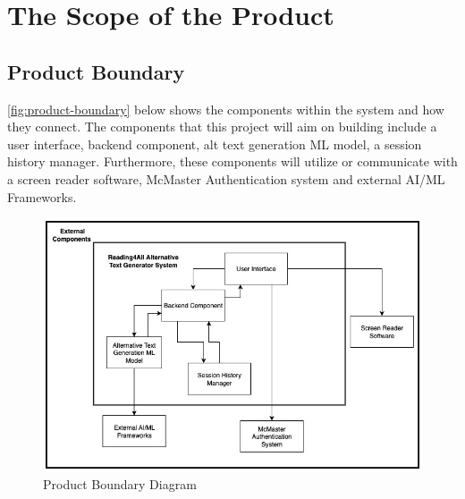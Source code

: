 \documentclass[12pt]{article}
\begin{document}
\section{The Scope of the Product}
\subsection{Product Boundary}
\autoref{fig:product-boundary} below shows the components within the system and how they connect. The components that this project will aim on building include a user interface, backend component, alt text generation ML model, a session history manager. Furthermore, these components will utilize or communicate with a screen reader software, McMaster Authentication system and external AI/ML Frameworks. 
\label{tab:product-boundary} 
\begin{figure}[H]
    \centering
    \includegraphics[width=1.0\textwidth]{images/Product_Boundary_Diagram.jpg}
    \caption{Product Boundary Diagram}
    \label{fig:product-boundary}
\end{figure}
\end{document}
